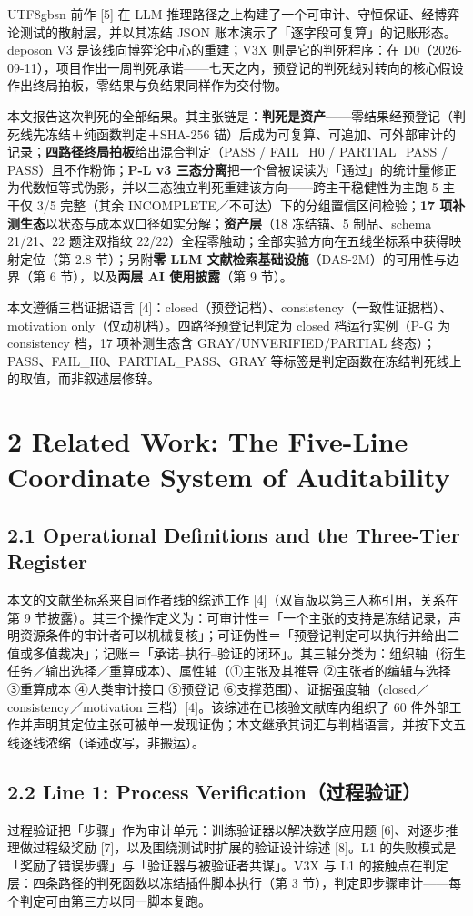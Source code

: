 \documentclass[10pt,a4paper]{article}
\begin{document}
\begin{CJK}{UTF8}{gbsn}
前作 [5] 在 LLM 推理路径之上构建了一个可审计、守恒保证、经博弈论测试的散射层，并以其冻结 JSON 账本演示了「逐字段可复算」的记账形态。deposon V3 是该线向博弈论中心的重建；V3X 则是它的判死程序：在 D0（2026-09-11），项目作出一周判死承诺——七天之内，预登记的判死线对转向的核心假设作出终局拍板，零结果与负结果同样作为交付物。

本文报告这次判死的全部结果。其主张链是：\textbf{判死是资产}——零结果经预登记（判死线先冻结＋纯函数判定＋SHA-256 锚）后成为可复算、可追加、可外部审计的记录；\textbf{四路径终局拍板}给出混合判定（PASS / FAIL\_H0 / PARTIAL\_PASS / PASS）且不作粉饰；\textbf{P-L v3 三态分离}把一个曾被误读为「通过」的统计量修正为代数恒等式伪影，并以三态独立判死重建该方向——跨主干稳健性为主跑 5 主干仅 3/5 完整（其余 INCOMPLETE／不可达）下的分组置信区间检验；\textbf{17 项补测生态}以状态与成本双口径如实分解；\textbf{资产层}（18 冻结锚、5 制品、schema 21/21、22 题注双指纹 22/22）全程零触动；全部实验方向在五线坐标系中获得映射定位（第 2.8 节）；另附\textbf{零 LLM 文献检索基础设施}（DAS-2M）的可用性与边界（第 6 节），以及\textbf{两层 AI 使用披露}（第 9 节）。

本文遵循三档证据语言 [4]：closed（预登记档）、consistency（一致性证据档）、motivation only（仅动机档）。四路径预登记判定为 closed 档运行实例（P-G 为 consistency 档，17 项补测生态含 GRAY/UNVERIFIED/PARTIAL 终态）；PASS、FAIL\_H0、PARTIAL\_PASS、GRAY 等标签是判定函数在冻结判死线上的取值，而非叙述层修辞。


\section*{2 Related Work: The Five-Line Coordinate System of Auditability}\subsection*{2.1 Operational Definitions and the Three-Tier Register}本文的文献坐标系来自同作者线的综述工作 [4]（双盲版以第三人称引用，关系在第 9 节披露）。其三个操作定义为：可审计性＝「一个主张的支持是冻结记录，声明资源条件的审计者可以机械复核」；可证伪性＝「预登记判定可以执行并给出二值或多值裁决」；记账＝「承诺–执行–验证的闭环」。其三轴分类为：组织轴（衍生任务／输出选择／重算成本）、属性轴（①主张及其推导 ②主张者的编辑与选择 ③重算成本 ④人类审计接口 ⑤预登记 ⑥支撑范围）、证据强度轴（closed／consistency／motivation 三档）[4]。该综述在已核验文献库内组织了 60 件外部工作并声明其定位主张可被单一发现证伪；本文继承其词汇与判档语言，并按下文五线逐线浓缩（译述改写，非搬运）。

\subsection*{2.2 Line 1: Process Verification（过程验证）}过程验证把「步骤」作为审计单元：训练验证器以解决数学应用题 [6]、对逐步推理做过程级奖励 [7]，以及围绕测试时扩展的验证设计综述 [8]。L1 的失败模式是「奖励了错误步骤」与「验证器与被验证者共谋」。V3X 与 L1 的接触点在判定层：四条路径的判死函数以冻结插件脚本执行（第 3 节），判定即步骤审计——每个判定可由第三方以同一脚本复跑。


\end{CJK}
\end{document}
